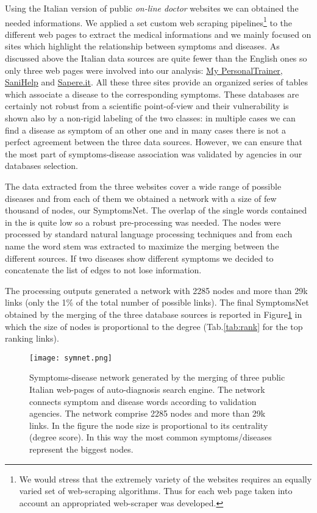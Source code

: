 \documentclass{standalone}
\begin{document}
Using the Italian version of public \emph{on-line doctor} websites we can obtained the needed informations.
We applied a set custom web scraping pipelines\footnote{
  We would stress that the extremely variety of the websites requires an equally varied set of web-scraping algorithms.
  Thus for each web page taken into account an appropriated web-scraper was developed.
} to the different web pages to extract the medical informations and we mainly focused on sites which highlight the relationship between symptoms and diseases.
As discussed above the Italian data sources are quite fewer than the English ones so only three web pages were involved into our analysis: \href{https://m.my-personaltrainer.it/}{My PersonalTrainer}, \href{http://www.sanihelp.it/}{SaniHelp} and \href{http://www.sapere.it/}{Sapere.it}.
All these three sites provide an organized series of tables which associate a disease to the corresponding symptoms.
These databases are certainly not robust from a scientific point-of-view and their vulnerability is shown also by a non-rigid labeling of the two classes: in multiple cases we can find a disease as symptom of an other one and in many cases there is not a perfect agreement between the three data sources.
However, we can ensure that the most part of symptoms-disease association was validated by  agencies in our databases selection.

The data extracted from the three websites cover a wide range of possible diseases and from each of them we obtained a network with a size of few thousand of nodes, our \textsf{SymptomsNet}.
The overlap of the single words contained in the  is quite low so a robust pre-processing was needed.
The nodes were processed by standard natural language processing techniques and from each name the word stem was extracted to maximize the merging between the different sources.
If two diseases show different symptoms we decided to concatenate the list of edges to not lose information.

The processing outputs generated a network with 2285 nodes and more than 29k links (only the 1\% of the total number of possible links).
The final \textsf{SymptomsNet} obtained by the merging of the three database sources is reported in Figure\ref{fig:net} in which the size of nodes is proportional to the degree (Tab.\ref{tab:rank} for the top ranking links).

\begin{figure}[htbp]
\centering
\texttt{[image: symnet.png]}
\caption{Symptoms-disease network generated by the merging of three public Italian web-pages of auto-diagnosis search engine.
The network connects symptom and disease words according to validation agencies.
The network comprise 2285 nodes and more than 29k links.
In the figure the node size is proportional to its centrality (degree score).
In this way the most common symptoms/diseases represent the biggest nodes.
}
\label{fig:net}
\end{figure}
\end{document}
